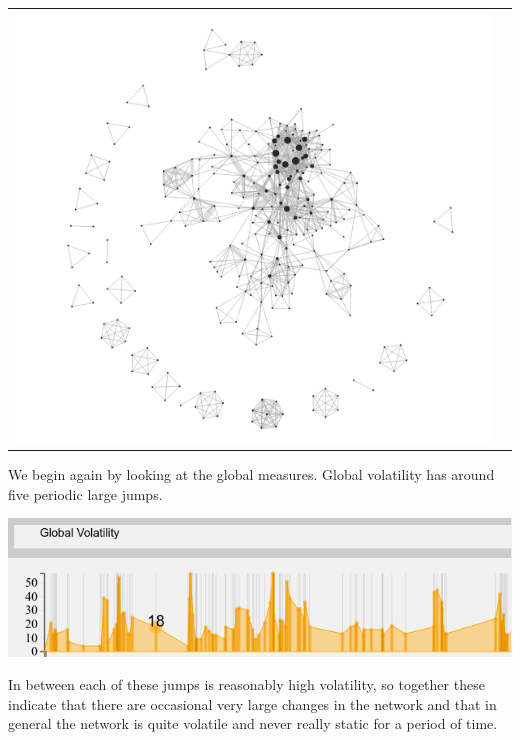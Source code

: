 \begin{center}
\begin{tabular}{cc}
\label{edgeTypes}
\includegraphics[trim={0 0 0 0}, width=140mm]{./Figures/TurinLocalVolatilityFull.png}
\end{tabular}
\end{center}

We begin again by looking at the global measures. Global volatility has around five periodic large jumps.
\begin{center}
\includegraphics[trim={0 0 0 0}, width=140mm]{./Figures/TurinGlobalVolatility.png}
\end{center}   

In between each of these jumps is reasonably high volatility, so together these indicate that there are occasional very large changes in the network and that in general the network is quite volatile and never really static for a period of time.
    
